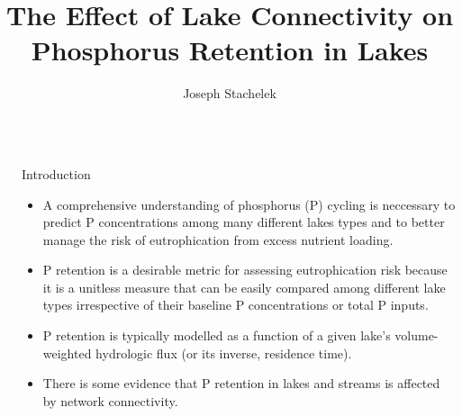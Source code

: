 \documentclass[final,hyperref={pdfpagelabels=false}]{beamer}
\title{\huge The Effect of Lake Connectivity on Phosphorus Retention in Lakes} %
\author{Joseph Stachelek} %
\institute{Department of Fisheries and Wildlife, Michigan State University, MI, USA} %
\begin{document}

\begin{frame}[t] %

\begin{columns}[t] %

\begin{column}{.02\textwidth}\end{column} %

\begin{column}{.465\textwidth} %

            
\begin{block}{Introduction}

\begin{itemize}
\item A comprehensive understanding of phosphorus (P) cycling is neccessary to predict P concentrations among many different lakes types and to better manage the risk of eutrophication from excess nutrient loading.
\vspace{1em}
\item P retention is a desirable metric for assessing eutrophication risk because it is a unitless measure that can be easily compared among different lake types irrespective of their baseline P concentrations or total P inputs.
\vspace{1em}
\item P retention is typically modelled as a function of a given lake's volume-weighted hydrologic flux (or its inverse, \alert{residence time}).
\vspace{-0.5em}
\item There is some evidence that P retention in lakes and streams is affected by network connectivity. 
\end{itemize}
\end{block}


\end{column}
\end{columns}
\end{frame}
\end{document}
